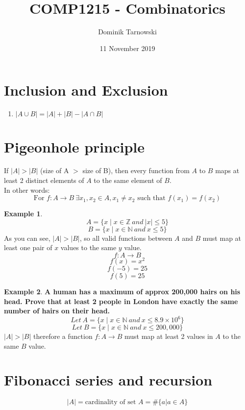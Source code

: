 \documentclass{article}
\theoremstyle{definition}
\newtheorem{ex}{Example}[section]
\begin{document}
  \title{COMP1215 - Combinatorics}
  \author{Dominik Tarnowski}
  \date{11 November 2019}
  \maketitle

  \tableofcontents


  \section{Inclusion and Exclusion}
  \begin{enumerate}
    \item $|A \cup B| = |A| + |B| - |A \cap B|$
  \end{enumerate}

  \section{Pigeonhole principle}
  If $|A| > |B|$ (size of A $>$ size of B), then every function from $A$ to $B$ maps at least 2 distinct elements of $A$ to the same element of $B$. \\
  In other words:
  \[\text{For } f:A \to B\ \exists x_1,x_2 \in A, x_1 \neq x_2 \text{ such that } f(x_1) = f(x_2) \]
  
  \begin{ex}
    \[A = \{x \mid x \in \mathbb{Z}\ and\ |x| \leq 5\}\]
    \[B = \{x \mid x \in \mathbb{N}\ and\ x \leq 5\}\]
    As you can see, $|A|>|B|$, so all valid functions between $A$ and $B$ must map at least one pair of $x$ values to the same $y$ value.
    \[f: A \to B\]
    \[f(x) = x^2\]
    \[f(-5) = 25\]
    \[f(5) = 25\]
  \end{ex}

  \begin{ex}
    \textbf{A human has a maximum of approx 200,000 hairs on his head. Prove that at least 2 people in London have exactly the same number of hairs on their head.}
    \[Let\ A = \{x \mid x \in \mathbb{N}\ and\ x \leq 8.9 \times 10^6\}\]
    \[Let\ B = \{x \mid x \in \mathbb{N}\ and\ x \leq 200,000\}\]
    $|A|>|B|$ therefore a function $f : A \to B$ must map at least 2 values in $A$ to the same $B$ value.
  \end{ex}

  \section{Fibonacci series and recursion}
  \[|A| = \text{cardinality of set } A = \#\{a|a \in A\}\]
\end{document}
